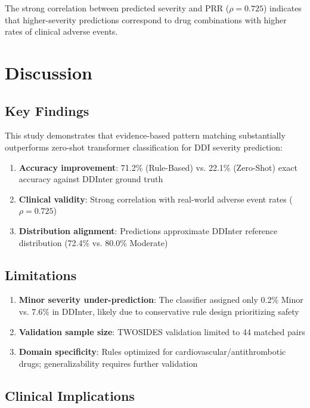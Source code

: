 \documentclass[11pt,a4paper]{article}
\begin{document}
The strong correlation between predicted severity and PRR ($\rho = 0.725$) indicates that higher-severity predictions correspond to drug combinations with higher rates of clinical adverse events.

\section*{Discussion}

\subsection*{Key Findings}

This study demonstrates that evidence-based pattern matching substantially outperforms zero-shot transformer classification for DDI severity prediction:

\begin{enumerate}
\item \textbf{Accuracy improvement}: 71.2\% (Rule-Based) vs. 22.1\% (Zero-Shot) exact accuracy against DDInter ground truth
\item \textbf{Clinical validity}: Strong correlation with real-world adverse event rates ($\rho = 0.725$)
\item \textbf{Distribution alignment}: Predictions approximate DDInter reference distribution (72.4\% vs. 80.0\% Moderate)
\end{enumerate}

\subsection*{Limitations}

\begin{enumerate}
\item \textbf{Minor severity under-prediction}: The classifier assigned only 0.2\% Minor vs. 7.6\% in DDInter, likely due to conservative rule design prioritizing safety
\item \textbf{Validation sample size}: TWOSIDES validation limited to 44 matched pairs
\item \textbf{Domain specificity}: Rules optimized for cardiovascular/antithrombotic drugs; generalizability requires further validation
\end{enumerate}

\subsection*{Clinical Implications}
\end{document}
